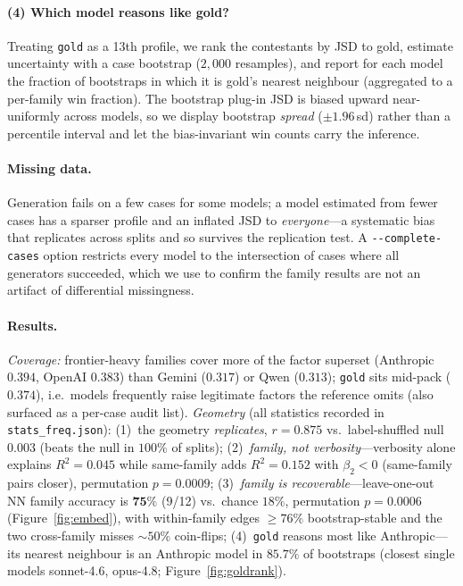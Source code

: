 \documentclass{article}
\begin{document}
\paragraph{(4) Which model reasons like gold?} Treating \texttt{gold} as a 13th profile, we rank
the contestants by JSD to gold, estimate uncertainty with a case bootstrap ($2{,}000$ resamples),
and report for each model the fraction of bootstraps in which it is gold's nearest neighbour
(aggregated to a per-family win fraction). The bootstrap plug-in JSD is biased upward
near-uniformly across models, so we display bootstrap \emph{spread} ($\pm1.96$\,sd) rather than a
percentile interval and let the bias-invariant win counts carry the inference.

\paragraph{Missing data.} Generation fails on a few cases for some models; a model estimated from
fewer cases has a sparser profile and an inflated JSD to \emph{everyone}---a systematic bias that
replicates across splits and so survives the replication test. A \texttt{-{}-complete-cases}
option restricts every model to the intersection of cases where all generators succeeded, which we
use to confirm the family results are not an artifact of differential missingness.

\paragraph{Results.} \emph{Coverage:} frontier-heavy families cover more of the factor superset
(Anthropic $0.394$, OpenAI $0.383$) than Gemini ($0.317$) or Qwen ($0.313$); \texttt{gold} sits
mid-pack ($0.374$), i.e.\ models frequently raise legitimate factors the reference omits (also
surfaced as a per-case audit list). \emph{Geometry} (all statistics recorded in
\texttt{stats\_freq.json}): (1)~the geometry \emph{replicates}, $r{=}0.875$ vs.\ label-shuffled
null $0.003$ (beats the null in $100\%$ of splits); (2)~\emph{family, not verbosity}---verbosity
alone explains $R^2{=}0.045$ while same-family adds $R^2{=}0.152$ with $\beta_2{<}0$ (same-family
pairs closer), permutation $p{=}0.0009$; (3)~\emph{family is recoverable}---leave-one-out NN
family accuracy is $\mathbf{75\%}$ (9/12) vs.\ chance $18\%$, permutation $p{=}0.0006$
(Figure~\ref{fig:embed}), with within-family edges $\geq76\%$ bootstrap-stable and the two
cross-family misses $\sim\!50\%$ coin-flips; (4)~\texttt{gold} reasons most like Anthropic---its
nearest neighbour is an Anthropic model in $85.7\%$ of bootstraps (closest single models
sonnet-4.6, opus-4.8; Figure~\ref{fig:goldrank}).
\end{document}

